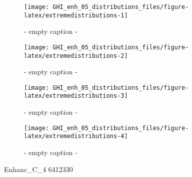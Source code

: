 \documentclass[
  10pt,
  a4paper,oneside]{article}
\begin{document}
\begin{figure}[H]

{\centering \texttt{[image: GHI\_enh\_05\_distributions\_files/figure-latex/extremedistributions-1]} 

}

\caption{ - empty caption - }\label{fig:extremedistributions-1}
\end{figure}
\begin{figure}[H]

{\centering \texttt{[image: GHI\_enh\_05\_distributions\_files/figure-latex/extremedistributions-2]} 

}

\caption{ - empty caption - }\label{fig:extremedistributions-2}
\end{figure}
\begin{figure}[H]

{\centering \texttt{[image: GHI\_enh\_05\_distributions\_files/figure-latex/extremedistributions-3]} 

}

\caption{ - empty caption - }\label{fig:extremedistributions-3}
\end{figure}
\begin{figure}[H]

{\centering \texttt{[image: GHI\_enh\_05\_distributions\_files/figure-latex/extremedistributions-4]} 

}

\caption{ - empty caption - }\label{fig:extremedistributions-4}
\end{figure}

Enhanc\_C\_4
6412330
\end{document}
